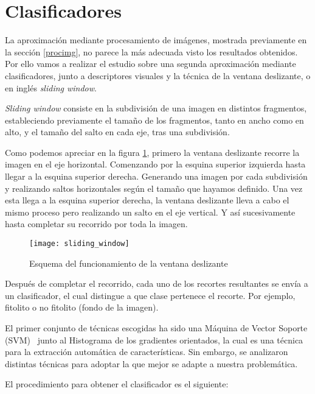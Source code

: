 \section{Clasificadores}

La aproximación mediante procesamiento de imágenes, mostrada previamente en la sección \ref{procimg}, no parece la más adecuada visto los resultados obtenidos. Por ello vamos a realizar el estudio sobre una segunda aproximación  mediante clasificadores, junto a descriptores visuales y la técnica de la ventana deslizante, o en inglés \textit{sliding window}.

\textit{Sliding window} consiste en la subdivisión de una imagen en distintos fragmentos, estableciendo previamente el tamaño de los fragmentos, tanto en ancho como en alto, y el tamaño del salto en cada eje, tras una subdivisión. 

Como podemos apreciar en la figura \ref{fig:sliding_window}, primero la ventana deslizante recorre la imagen en el eje horizontal. Comenzando por la esquina superior izquierda hasta llegar a la esquina superior derecha. Generando una imagen por cada subdivisión y realizando saltos horizontales según el tamaño que hayamos definido. Una vez esta llega a la esquina superior derecha, la ventana deslizante lleva a cabo el mismo proceso pero realizando un salto en el eje vertical. Y así sucesivamente hasta completar su recorrido por toda la imagen.

\begin{figure}
\centering
\texttt{[image: sliding\_window]}
\caption[Esquema del funcionamiento de la ventana deslizante]{Esquema del funcionamiento de la ventana deslizante~\cite{jcp}}
\label{fig:sliding_window}
\end{figure}

Después de completar el recorrido, cada uno de los recortes resultantes se envía a un clasificador, el cual distingue a que clase pertenece el recorte. Por ejemplo, fitolito o no fitolito (fondo de la imagen).

El primer conjunto de técnicas escogidas ha sido una Máquina de Vector Soporte (SVM)~\cite{svm} junto al Histograma de los gradientes orientados, la cual es una técnica para la extracción automática de características. Sin embargo, se analizaron distintas técnicas para adoptar la que mejor se adapte a nuestra problemática.

El procedimiento para obtener el clasificador es el siguiente:


